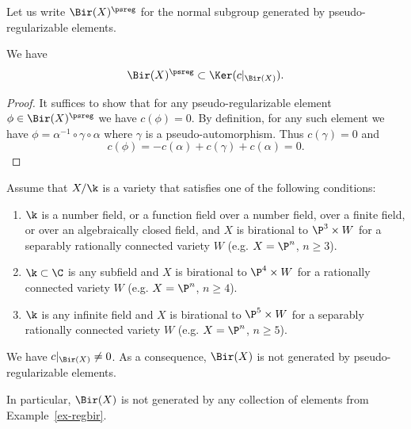 Let us write
$\Bir(X)^{\psreg}$ for the normal subgroup
generated by pseudo-regularizable elements.

\begin{lemma}
\notready\label{lem:regularizable}
We have
\[
\Bir(X)^{\psreg} \subset \Ker(c|_{\Bir(X)}).
\]
\end{lemma}
\begin{proof}
It suffices to show that
for any pseudo-regularizable element
$\phi \in \Bir(X)^{\psreg}$ we have
$c(\phi) = 0$.
By definition, for any such element
we have $\phi = \alpha^{-1} \circ \gamma \circ \alpha$ where $\gamma$ is a pseudo-automorphism.
Thus $c(\gamma) = 0$ and
\begin{equation*}
c(\phi) = -{c}(\alpha) + {c}(\gamma) + {c}(\alpha) = 0.
\end{equation*}
\end{proof}


\begin{theorem}
\notready\label{thm:bir-generation}
Assume that $X/\k$ is a variety
that
satisfies one of the following conditions:
\begin{enumerate}
    \item[(a)] $\k$ is a number field,
    or a function field over a number field,
    over a finite field, or over an algebraically closed field,
    and $X$ is birational to $\P^3 \times W$ for a
    separably rationally
    connected variety $W$
    (e.g. $X = \P^n$, $n \ge 3$).
    \item[(b)] $\k \subset \C$ is any subfield
    and $X$ is birational to $\P^4 \times W$ for a  rationally
    connected variety $W$
    (e.g. $X = \P^n$, $n \ge 4$).
    \item[(c)] $\k$ is any infinite
    field
    and $X$ is birational to $\P^5 \times W$ for a separably rationally
    connected variety $W$
    (e.g. $X = \P^n$, $n \ge 5$).
\end{enumerate}
We have $c|_{\Bir(X)} \ne 0$.
As a consequence,
$\Bir(X)$ is not generated by pseudo-regularizable elements.
\end{theorem}

In particular, $\Bir(X)$ is not generated by
any collection of elements from Example~\ref{ex-regbir}.



